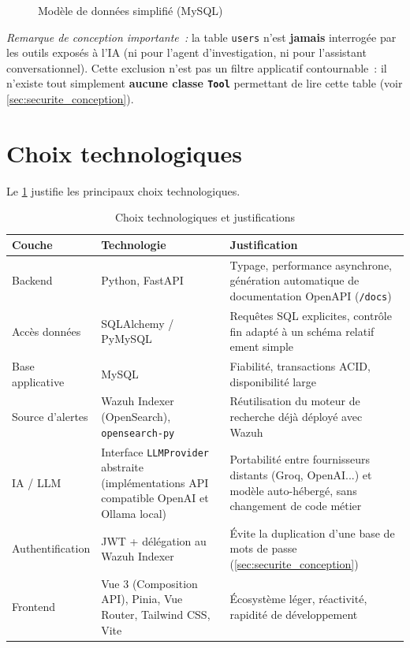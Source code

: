 \begin{figure}[H]
{}
\caption{Modèle de données simplifié (MySQL)}
\label{fig:erd}
\end{figure}

\noindent\textit{Remarque de conception importante~:} la table
\texttt{users} n'est \textbf{jamais} interrogée par les outils exposés à
l'IA (ni pour l'agent d'investigation, ni pour l'assistant conversationnel).
Cette exclusion n'est pas un filtre applicatif contournable~: il n'existe
tout simplement \textbf{aucune classe \texttt{Tool}} permettant de lire
cette table (voir \cref{sec:securite_conception}).

\section{Choix technologiques}

Le \cref{tab:techstack} justifie les principaux choix technologiques.

\begin{table}[H]
\centering
\caption{Choix technologiques et justifications}
\label{tab:techstack}
\begin{tabular}{@{}p{3cm}p{3.6cm}p{7cm}@{}}
\toprule
\textbf{Couche} & \textbf{Technologie} & \textbf{Justification} \\
\midrule
Backend & Python, FastAPI & Typage, performance asynchrone, génération
automatique de documentation OpenAPI (\texttt{/docs}) \\
Accès données & SQLAlchemy / PyMySQL & Requêtes SQL explicites,
contrôle fin adapté à un schéma relatif ement simple \\
Base applicative & MySQL & Fiabilité, transactions ACID, disponibilité
large \\
Source d'alertes & Wazuh Indexer (OpenSearch), \texttt{opensearch-py} &
Réutilisation du moteur de recherche déjà déployé avec Wazuh \\
IA / LLM & Interface \texttt{LLMProvider} abstraite (implémentations
API compatible OpenAI et Ollama local) & Portabilité entre fournisseurs
distants (Groq, OpenAI...) et modèle auto-hébergé, sans changement de
code métier \\
Authentification & JWT + délégation au Wazuh Indexer & Évite la
duplication d'une base de mots de passe (\cref{sec:securite_conception}) \\
Frontend & Vue 3 (Composition API), Pinia, Vue Router, Tailwind CSS,
Vite & Écosystème léger, réactivité, rapidité de développement \\
\bottomrule
\end{tabular}
\end{table}

